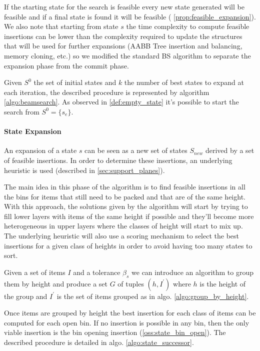 If the starting state for the search is feasible every new state generated will be feasible and if a final state is found it will be feasible ( \cref{prop:feasible_expansion}).
We also note that starting from state $s$ the time complexity to compute feasible insertions can be lower than the complexity required to update the structures that will be used for further expansions (AABB Tree insertion and balancing, memory cloning, etc.) so we modified the standard BS algorithm to separate the expansion phase from the commit phase.

Given $S^0$ the set of initial states and $k$ the number of best states to expand at each iteration, the described procedure is represented by algorithm \ref{algo:beamsearch}.
As observed in \cref{def:empty_state} it's possible to start the search from $S^0 = \{ s_e \}$.



\paragraph*{State Expansion}

An expansion of a state $s$ can be seen as a new set of states $S_{new}$ derived by a set of feasible insertions.
In order to determine these insertions, an underlying heuristic is used (described in \cref{sec:support_planes}).

The main idea in this phase of the algorithm is to find feasible insertions in all the bins for items that still need to be packed and that are of the same height.
With this approach, the solutions given by the algorithm will start by trying to fill lower layers with items of the same height if possible and they'll become more heterogeneous in upper layers where the classes of height will start to mix up.
The underlying heuristic will also use a scoring mechanism to select the best insertions for a given class of heights in order to avoid having too many states to sort.

Given a set of items $I$ and a tolerance $\beta_s$ we can introduce an algorithm to group them by height and produce a set $G$ of tuples $(h, I^\prime)$ where $h$ is the height of the group and $I^\prime$ is the set of items grouped as in algo. \ref{algo:group_by_height}.

Once items are grouped by height the best insertion for each class of items can be computed for each open bin. If no insertion is possible in any bin, then the only viable insertion is the bin opening insertion (\cref{oss:state_bin_open}).
The described procedure is detailed in algo. \ref{algo:state_successor}.

